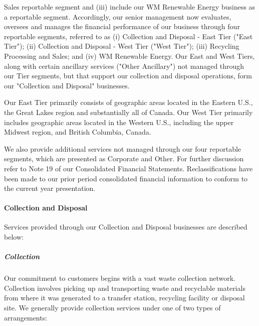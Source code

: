 \documentclass{article}
\begin{document}
Sales reportable segment and (iii) include our WM Renewable Energy business as a reportable segment. Accordingly, our senior management now evaluates, oversees and manages the financial performance of our business through four reportable segments, referred to as (i) Collection and Disposal - East Tier ("East Tier"); (ii) Collection and Disposal - West Tier ("West Tier"); (iii) Recycling Processing and Sales; and (iv) WM Renewable Energy. Our East and West Tiers, along with certain ancillary services ("Other Ancillary") not managed through our Tier segments, but that support our collection and disposal operations, form our "Collection and Disposal" businesses.

Our East Tier primarily consists of geographic areas located in the Eastern U.S., the Great Lakes region and substantially all of Canada. Our West Tier primarily includes geographic areas located in the Western U.S., including the upper Midwest region, and British Columbia, Canada.

We also provide additional services not managed through our four reportable segments, which are presented as Corporate and Other. For further discussion refer to Note 19 of our Consolidated Financial Statements. Reclassifications have been made to our prior period consolidated financial information to conform to the current year presentation.

\paragraph{Collection and Disposal}

Services provided through our Collection and Disposal businesses are described below:

\subparagraph{Collection}
Our commitment to customers begins with a vast waste collection network. Collection involves picking up and transporting waste and recyclable materials from where it was generated to a transfer station, recycling facility or disposal site. We generally provide collection services under one of two types of arrangements:
\end{document}
